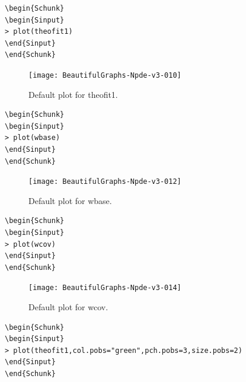 \documentclass{report}
\begin{document}
\begin{lstlisting}[linerange=\\begin\{Sinput\}-\\end\{Sinput\}, includerangemarker=false]
\begin{Schunk}
\begin{Sinput}
> plot(theofit1)
\end{Sinput}
\end{Schunk}
\end{lstlisting}


\begin{figure}[H]
\caption{Default plot for theofit1.}
\label{fig:plotByDefault}
\centering
\texttt{[image: BeautifulGraphs-Npde-v3-010]}
\end{figure}

\begin{lstlisting}[linerange=\\begin\{Sinput\}-\\end\{Sinput\}, includerangemarker=false]
\begin{Schunk}
\begin{Sinput}
> plot(wbase)
\end{Sinput}
\end{Schunk}
\end{lstlisting}


\begin{figure}[H]
\caption{Default plot for wbase.}
\label{fig:plotByDefault}
\centering
\texttt{[image: BeautifulGraphs-Npde-v3-012]}
\end{figure}

\begin{lstlisting}[linerange=\\begin\{Sinput\}-\\end\{Sinput\}, includerangemarker=false]
\begin{Schunk}
\begin{Sinput}
> plot(wcov)
\end{Sinput}
\end{Schunk}
\end{lstlisting}


\begin{figure}[H]
\caption{Default plot for wcov.}
\label{fig:plotByDefault}
\centering
\texttt{[image: BeautifulGraphs-Npde-v3-014]}
\end{figure}

\begin{lstlisting}[linerange=\\begin\{Sinput\}-\\end\{Sinput\}, includerangemarker=false]
\begin{Schunk}
\begin{Sinput}
> plot(theofit1,col.pobs="green",pch.pobs=3,size.pobs=2)
\end{Sinput}
\end{Schunk}
\end{lstlisting}
\end{document}
